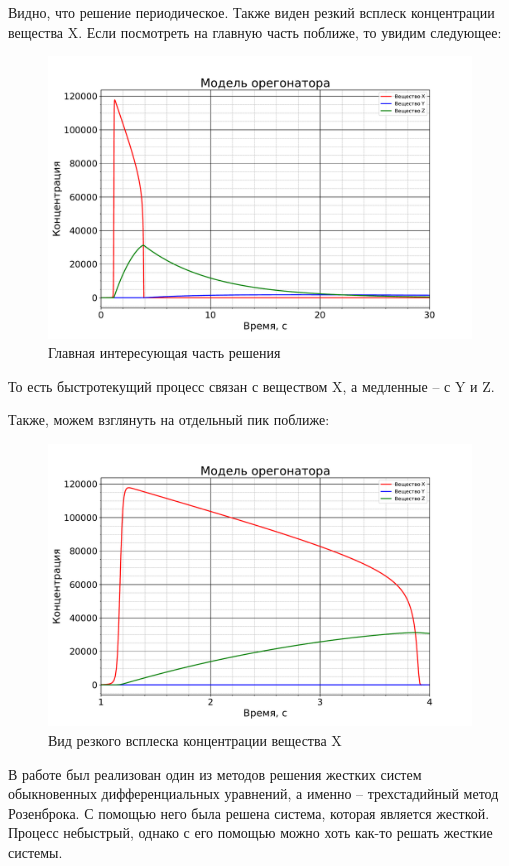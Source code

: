 		Видно, что решение периодическое. Также виден резкий всплеск концентрации вещества X. Если посмотреть на главную часть поближе, то увидим следующее:
		\begin{figure}[h!]
			\centering
			\includegraphics[width=1.1\linewidth]{Pictures/Part.pdf}
			\caption{Главная интересующая часть решения}
		\end{figure}
	
		То есть быстротекущий процесс связан с веществом X, а медленные -- с Y и Z.
		
		Также, можем взглянуть на отдельный пик поближе:
		\newpage
		\begin{figure}[h!]
			\centering
			\includegraphics[width=1.1\linewidth]{Pictures/OnePeak.pdf}
			\caption{Вид резкого всплеска концентрации вещества X}
		\end{figure}
		
		В работе был реализован один из методов решения жестких систем обыкновенных дифференциальных уравнений, а именно -- трехстадийный метод Розенброка. С помощью него была решена система, которая является жесткой. Процесс небыстрый, однако с его помощью можно хоть как-то решать жесткие системы.
		
		
